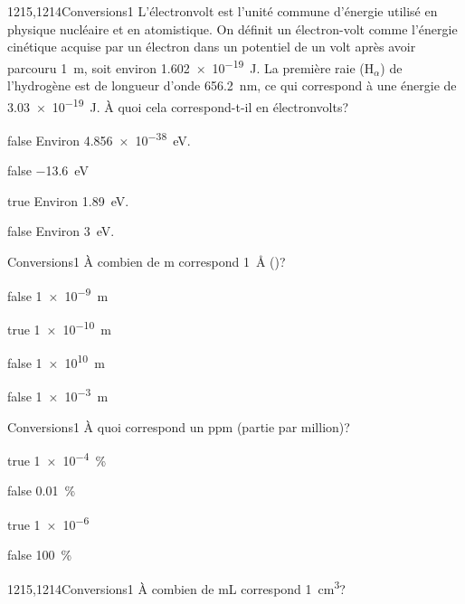 		\begin{question}{1215,1214}{Conversions}{1}{}
            L'électronvolt est l'unité commune d'énergie utilisé en physique nucléaire et en atomistique. On définit un électron-volt comme l'énergie cinétique acquise par un électron dans un potentiel de un volt après avoir parcouru \SI{1}{\meter}, soit environ \SI{1.602e-19}{\joule}. La première raie (H$_\alpha$) de l'hydrogène est de longueur d'onde \SI{656.2}{\nano\meter}, ce qui correspond à une énergie de \SI{3.03e-19}{\joule}. À quoi cela correspond-t-il en électronvolts?
        \end{question}
        \begin{reponses}
		    \item[false] Environ \SI{4.856e-38}{\electronvolt}.
		    \item[false] \SI{-13.6}{\electronvolt}
		    \item[true] Environ \SI{1.89}{\electronvolt}.
		    \item[false] Environ \SI{3}{\electronvolt}.
        \end{reponses}
		\begin{question}{}{Conversions}{1}{}
            À combien de \si{\meter} correspond \SI{1}{\angstrom} ()?
        \end{question}
        \begin{reponses}
            \item[false] \SI{1e-9}{\meter}
            \item[true] \SI{1e-10}{\meter}
            \item[false] \SI{1e10}{\meter}
            \item[false] \SI{1e-3}{\meter}
        \end{reponses}
		\begin{question}{}{Conversions}{1}{}
			À quoi correspond un \si{ppm} (partie par million)?
        \end{question}
        \begin{reponses} 
            \item[true] \SI{1e-4}{\percent}
            \item[false] \SI{0.01}{\percent}
            \item[true] \num{1e-6}
    	    \item[false] \SI{100}{\percent}
        \end{reponses}
		\begin{question}{1215,1214}{Conversions}{1}{}
            À combien de \si{\milli\liter} correspond \SI{1}{\centi\meter\cubed}?
        \end{question}
